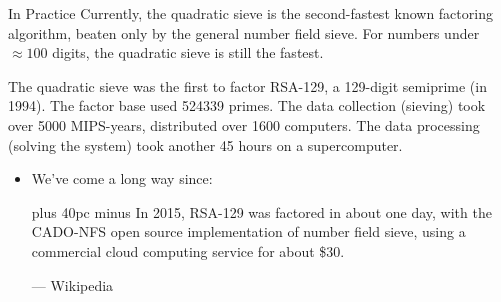 \documentclass[aspectratio=169]{beamer}
\newcommand\quoteAuthor[2]{\begingroup
  \baselineskip 10pt
  \parfillskip 0pt
  \interlinepenalty 10000 %
  \leftskip 0pt plus 40pc minus \parindent
  \let\rm=\eightss
  \let\sl=\eightssi
  \everypar{\sl}#1\par
  \nobreak\smallskip
  \noindent\rm--- #2\unskip\par
  \endgroup}
\begin{document}
\begin{frame}{In Practice}
  Currently, the quadratic sieve is the second-fastest known factoring algorithm,
  beaten only by the general number field sieve.
  For numbers under $\approx 100$ digits, the quadratic sieve
  is still the fastest. \pause

  The quadratic sieve was the first to factor
  RSA-129, a 129-digit semiprime (in 1994). The factor base used 524339 primes.
  The data collection (sieving) took over 5000 MIPS-years, distributed over 1600 computers.
  The data processing (solving the system) took another 45 hours on a supercomputer. \pause
  \begin{itemize}
    \item We've come a long way since:

    \quoteAuthor{In 2015, RSA-129 was factored in about one day,
    with the CADO-NFS open source implementation of number field sieve,
    using a commercial cloud computing service for about \$30.}{Wikipedia}
  \end{itemize}
\end{frame}




\end{document}
